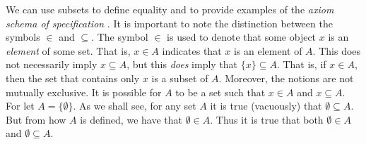         We can use subsets to define equality and to provide examples
        of the \textit{axiom schema of specification}%
        . It is important to note the
        distinction between the symbols $\in$ and $\subseteq$. The symbol $\in$
        is used to denote that some object $x$ is an \textit{element}%
         of some set. That is, $x\in{A}$ indicates that
        $x$ is an element of $A$. This does not necessarily imply
        $x\subseteq{A}$, but this \textit{does} imply that $\{x\}\subseteq{A}$.
        That is, if $x\in{A}$, then the set that contains only $x$ is a subset
        of $A$. Moreover, the notions are not mutually exclusive. It is possible
        for $A$ to be a set such that $x\in{A}$ and $x\subseteq{A}$. For let
        $A=\{\emptyset\}$. As we shall see, for any set $A$ it is true
        (vacuously) that $\emptyset\subseteq{A}$. But from how $A$ is defined,
        we have that $\emptyset\in{A}$. Thus it is true that both
        $\emptyset\in{A}$ and $\emptyset\subseteq{A}$.
